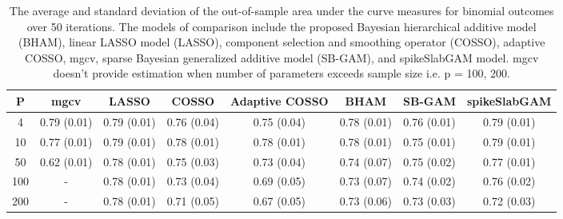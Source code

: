 \begin{table}[ht]
\centering
\begin{tabular}{cccccccc}
  \hline
P & mgcv & LASSO & COSSO & Adaptive COSSO & BHAM & SB-GAM & spikeSlabGAM \\ 
  \hline
  4 & 0.79 (0.01) & 0.79 (0.01) & 0.76 (0.04) & 0.75 (0.04) & 0.78 (0.01) & 0.76 (0.01) & 0.79 (0.01) \\ 
   10 & 0.77 (0.01) & 0.79 (0.01) & 0.78 (0.01) & 0.78 (0.01) & 0.78 (0.01) & 0.75 (0.01) & 0.79 (0.01) \\ 
   50 & 0.62 (0.01) & 0.78 (0.01) & 0.75 (0.03) & 0.73 (0.04) & 0.74 (0.07) & 0.75 (0.02) & 0.77 (0.01) \\ 
  100 & - & 0.78 (0.01) & 0.73 (0.04) & 0.69 (0.05) & 0.73 (0.07) & 0.74 (0.02) & 0.76 (0.02) \\ 
  200 & - & 0.78 (0.01) & 0.71 (0.05) & 0.67 (0.05) & 0.73 (0.06) & 0.73 (0.03) & 0.72 (0.03) \\ 
   \hline
\end{tabular}
\caption{The average and standard deviation of the out-of-sample area under the curve measures
    for binomial outcomes over 50 iterations. The models of comparison include the proposed
    Bayesian hierarchical additive model (BHAM), linear LASSO model (LASSO), component
    selection and smoothing operator (COSSO), adaptive COSSO, mgcv, sparse Bayesian
    generalized additive model (SB-GAM), and spikeSlabGAM model. mgcv doesn't provide
    estimation when number of parameters exceeds sample size i.e. p = 100, 200.} 
\label{tab:lnr_bin_auc}
\end{table}
